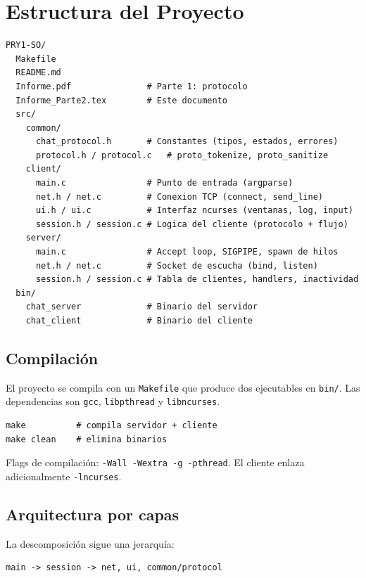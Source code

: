 \documentclass[12pt,a4paper]{article}
\begin{document}
\section{Estructura del Proyecto}

\begin{lstlisting}[style=protocol,caption={Árbol de archivos del proyecto}]
PRY1-SO/
  Makefile
  README.md
  Informe.pdf               # Parte 1: protocolo
  Informe_Parte2.tex        # Este documento
  src/
    common/
      chat_protocol.h       # Constantes (tipos, estados, errores)
      protocol.h / protocol.c   # proto_tokenize, proto_sanitize
    client/
      main.c                # Punto de entrada (argparse)
      net.h / net.c         # Conexion TCP (connect, send_line)
      ui.h / ui.c           # Interfaz ncurses (ventanas, log, input)
      session.h / session.c # Logica del cliente (protocolo + flujo)
    server/
      main.c                # Accept loop, SIGPIPE, spawn de hilos
      net.h / net.c         # Socket de escucha (bind, listen)
      session.h / session.c # Tabla de clientes, handlers, inactividad
  bin/
    chat_server             # Binario del servidor
    chat_client             # Binario del cliente
\end{lstlisting}

\subsection{Compilación}

El proyecto se compila con un \texttt{Makefile} que produce dos ejecutables en
\texttt{bin/}.  Las dependencias son \texttt{gcc}, \texttt{libpthread} y
\texttt{libncurses}.

\begin{lstlisting}[style=protocol]
make          # compila servidor + cliente
make clean    # elimina binarios
\end{lstlisting}

Flags de compilación: \texttt{-Wall -Wextra -g -pthread}.  El cliente enlaza
adicionalmente \texttt{-lncurses}.

\subsection{Arquitectura por capas}

La descomposición sigue una jerarquía:

\begin{lstlisting}[style=protocol]
main -> session -> net, ui, common/protocol
\end{lstlisting}
\end{document}
